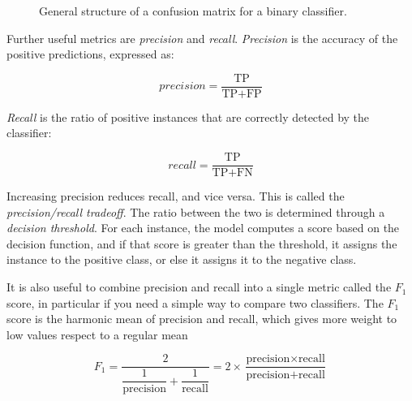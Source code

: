\begin{figure}[ht]
    \centering
    \caption{General structure of a confusion matrix for a binary classifier.}
    \label{fig:confusion_matrix}
\end{figure}

Further useful metrics are \textit{precision} and \textit{recall}.
\textit{Precision} is the accuracy of the positive predictions, expressed as:

\begin{equation}
    \textit{precision} = \frac{\text{TP}}{\text{TP}+\text{FP}}
\end{equation}

\textit{Recall} is the ratio of positive instances that are correctly detected by the classifier:

\begin{equation}
    \textit{recall} = \frac{\text{TP}}{\text{TP}+\text{FN}}
\end{equation}

Increasing precision reduces recall, and vice versa. This is called the \textit{precision/recall tradeoff}. The ratio between the two is determined through a \textit{decision threshold}. For each instance, the model computes a score based on the decision function, and if that score is greater than the threshold, it assigns the instance to the positive class, or else it assigns it to the negative class.

It is also useful to combine precision and recall into a single metric called the $F_1$ score, in particular if you need a simple way to compare two classifiers. The $F_1$ score is the harmonic mean of precision and recall, which gives more weight to low values respect to a regular mean

\begin{equation}
    F_1 = \frac{2}{\dfrac{1}{\text{precision}} + \dfrac{1}{\text{recall}}} = 2 \times \frac{\text{precision} \times \text{recall}}{\text{precision} + \text{recall}}
\end{equation}

